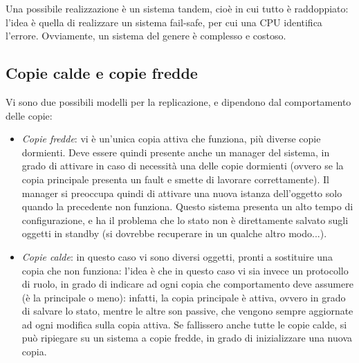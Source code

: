 Una possibile realizzazione è un sistema tandem, cioè in cui tutto è 
raddoppiato: l'idea è quella di realizzare un
sistema fail-safe, per cui una CPU identifica l'errore. Ovviamente, un sistema
del genere è complesso e costoso.
\subsection{Copie calde e copie fredde}
Vi sono due possibili modelli per la replicazione, e dipendono dal 
comportamento delle copie:
\begin{itemize}
 \item \textit{Copie fredde}: vi è un'unica copia attiva che funziona, più 
diverse copie dormienti. Deve essere quindi
 presente anche un manager del sistema, in grado di attivare in caso di 
necessità una delle copie dormienti (ovvero se
 la copia principale presenta un fault e smette di lavorare correttamente). Il 
manager si preoccupa quindi di attivare
 una nuova istanza dell'oggetto solo quando la precedente non funziona. Questo 
sistema presenta un alto tempo di
 configurazione, e ha il problema che lo stato non è direttamente salvato sugli 
oggetti in standby (si dovrebbe
 recuperare in un qualche altro modo...).
 \item \textit{Copie calde}: in questo caso vi sono diversi oggetti, pronti a 
sostituire una copia che non funziona:
 l'idea è che in questo caso vi sia invece un protocollo di ruolo, in grado di 
indicare ad ogni copia che comportamento
 deve assumere (è la principale o meno): infatti, la copia principale è attiva, 
ovvero in grado di salvare lo stato,
 mentre le altre son passive, che vengono sempre aggiornate ad ogni modifica 
sulla copia attiva. Se fallissero anche
 tutte le copie calde, si può ripiegare su un sistema a copie fredde, in grado 
di inizializzare una nuova copia.
\end{itemize}
